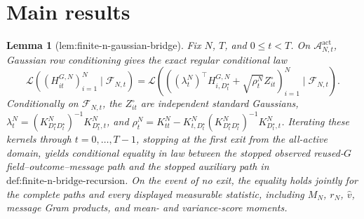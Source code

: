 \documentclass{article}
\newtheorem{lemma}{Lemma}
\begin{document}
\section{Main results}

\begin{lemma}[lem:finite-n-gaussian-bridge]\label{lem:finite-n-gaussian-bridge}
Fix \(N\), \(T\), and \(0\le t<T\). On \(\mathcal A_{N,t}^{\mathrm{act}}\), Gaussian row conditioning gives the exact regular conditional law \[\mathcal L\!\left((H_{it}^{G,N})_{i=1}^N\mid\mathscr F_{N,t}\right)=\mathcal L\!\left(\left((\lambda_t^{N})^{\top}H_{i,D_t^{\star}}^{G,N}+\sqrt{\rho_t^{N}}Z_{it}^{\circ}\right)_{i=1}^N\mid\mathscr F_{N,t}\right).\] Conditionally on \(\mathscr F_{N,t}\), the \(Z_{it}^{\circ}\) are independent standard Gaussians, \(\lambda_t^{N}=(K_{D_t^{\star}D_t^{\star}}^{N})^{-1}K_{D_t^{\star},t}^{N}\), and \(\rho_t^{N}=K_{tt}^{N}-K_{t,D_t^{\star}}^{N}(K_{D_t^{\star}D_t^{\star}}^{N})^{-1}K_{D_t^{\star},t}^{N}\). Iterating these kernels through \(t=0,\ldots,T-1\), stopping at the first exit from the all-active domain, yields conditional equality in law between the stopped observed reused-\(G\) field--outcome--message path and the stopped auxiliary path in \(\text{def:finite-n-bridge-recursion}\). On the event of no exit, the equality holds jointly for the complete paths and every displayed measurable statistic, including \(M_N\), \(r_N\), \(\widehat v\), message Gram products, and mean- and variance-score moments.
\end{lemma}
\end{document}
